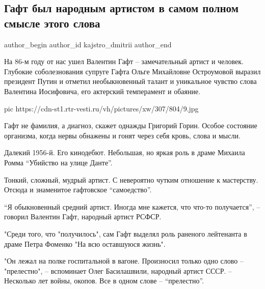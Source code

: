  
 
 
 
 
 
\subsection{Гафт был народным артистом в самом полном смысле этого слова}
\label{sec:12_12_2020.news.ru.vesti.kajstro_dmitrii.1.death_valentin_gaft}
\ifcmt
	author_begin
   author_id kajstro_dmitrii
	author_end
\fi

На 86-м году от нас ушел Валентин Гафт – замечательный артист и человек.
Глубокие соболезнования супруге Гафта Ольге Михайловне Остроумовой выразил
президент Путин и отметил необыкновенный талант и уникальное чувство слова
Валентина Иосифовича, его актерский темперамент и обаяние. 


\ifcmt
pic https://cdn-st1.rtr-vesti.ru/vh/pictures/xw/307/804/9.jpg
\fi

Гафт не фамилия, а диагноз, скажет однажды Григорий Горин. Особое состояние
организма, когда нервы обнажены и гонят через себя кровь, слова и мысли.

Далекий 1956-й. Его кинодебют. Небольшая, но яркая роль в драме Михаила Ромма
\enquote{Убийство на улице Данте}.

Тонкий, сложный, мудрый артист. С невероятно чутким отношение к мастерству.
Отсюда и знаменитое гафтовское \enquote{самоедство}.

\enquote{Я обыкновенный средний артист. Иногда мне кажется, что что-то получается}, –
говорил Валентин Гафт, народный артист РСФСР.

"Среди того, что "получилось", сам Гафт выделял роль раненого лейтенанта в
драме Петра Фоменко "На всю оставшуюся жизнь".

"Он лежал на полке госпитальной в вагоне. Произносил только одно слово –
"прелестно", – вспоминает Олег Басилашвили, народный артист СССР. – Несколько
лет войны, окопов. Все в одном слове – \enquote{прелестно}.

